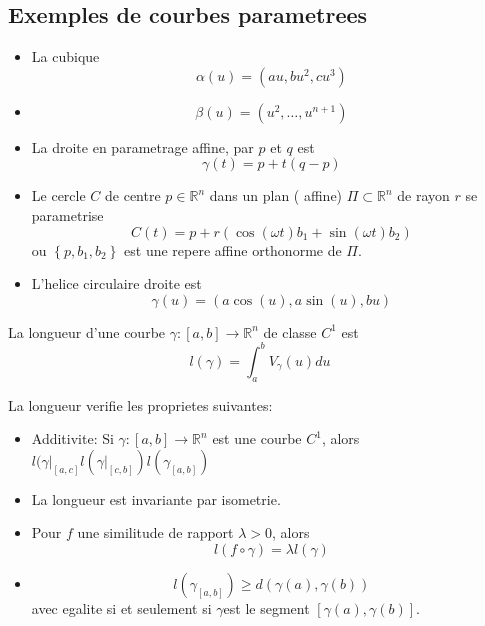 \documentclass[../main.tex]{subfiles}
\begin{document}
\subsection{Exemples de courbes parametrees}
\begin{itemize}
\item La cubique 
	\[ 
		\alpha( u) = ( au,b u^{2}, c u^{3}) 
	\]

\item 
	\[ 
		\beta( u) = ( u^{2}, \ldots, u^{n+1}) 
	\]
	
\item La droite en parametrage affine, par $p$ et $q$ est
	\[ 
		\gamma( t) = p + t( q-p) 
	\]
	
\item Le cercle $C$ de centre $p \in \mathbb{R}^n$ dans un plan ( affine) $\Pi \subset \mathbb{R}^n$ de rayon $r$  se parametrise
	\[ 
		C( t) = p + r \left( \cos( \omega t)b_1 + \sin ( \omega t) b_2\right) 
	\]
	ou $ \left\{ p,b_1,b_2 \right\} $ est une repere affine orthonorme de $\Pi$.
\item L'helice circulaire droite est 
	\[ 
		\gamma( u) = ( a \cos( u) , a \sin( u) , bu) 
	\]
	
\end{itemize}
\begin{defn}
La longueur d'une courbe $\gamma: [ a,b] \to \mathbb{R}^n$ de classe $C^{1}$ est
\[ 
	l( \gamma) = \int_{ a }^{ b } V_\gamma( u) du	
\]
 							
\end{defn}
\begin{propo}
La longueur verifie les proprietes suivantes:
\begin{itemize}
	\item Additivite: Si $\gamma: [ a,b] \to \mathbb{R}^n$ est une courbe $C^{1}$, alors $ l( \gamma|_{[a,c]}  l( \gamma|_{[ c,b]} ) l( \gamma_{ [ a,b] } )   $ 
\item La longueur est invariante par isometrie.\\

\item Pour $f$ une similitude de rapport $\lambda >0$, alors
	\[ 
		l( f\circ \gamma) = \lambda l( \gamma) 
	\]

\item 
	\[ 
		l( \gamma_{[a,b]} ) \geq d( \gamma( a) , \gamma( b) ) 	
	\]
	avec egalite si et seulement si $\gamma $est le segment $ [ \gamma( a) ,\gamma( b) ] $.
\end{itemize}

\end{propo}
\end{document}
